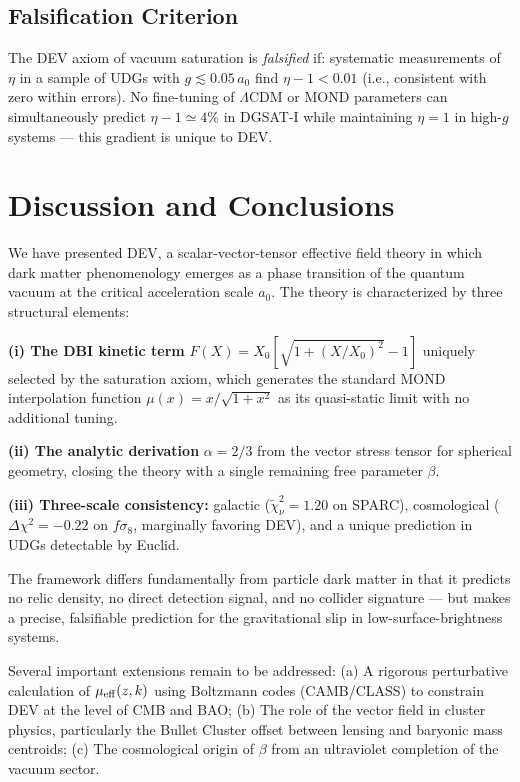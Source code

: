 \documentclass[aps,prd,twocolumn,showpacs,superscriptaddress]{revtex4-2}
\newcommand{\aO}{a_0}
\newcommand{\Xzero}{X_0}
\newcommand{\mueff}{\mu_{\rm eff}}
\newcommand{\LCDM}{$\Lambda$CDM}
\begin{document}
\subsection{Falsification Criterion}

The DEV axiom of vacuum saturation is \emph{falsified} if:
systematic measurements of $\eta$ in a sample of UDGs with
$g \lesssim 0.05\,\aO$ find $\eta - 1 < 0.01$ (i.e., consistent
with zero within errors).
No fine-tuning of \LCDM{} or MOND parameters can simultaneously
predict $\eta - 1 \simeq 4\%$ in DGSAT-I while maintaining
$\eta = 1$ in high-$g$ systems — this gradient is unique to DEV.

\section{Discussion and Conclusions}
\label{sec:conclusion}

We have presented DEV, a scalar-vector-tensor effective field theory
in which dark matter phenomenology emerges as a phase transition of
the quantum vacuum at the critical acceleration scale $\aO$.
The theory is characterized by three structural elements:

\textbf{(i) The DBI kinetic term} $F(X) = \Xzero[\sqrt{1+(X/\Xzero)^2}-1]$
uniquely selected by the saturation axiom, which generates the
standard MOND interpolation function $\mu(x) = x/\sqrt{1+x^2}$
as its quasi-static limit with no additional tuning.

\textbf{(ii) The analytic derivation} $\alpha = 2/3$ from the vector
stress tensor for spherical geometry, closing the theory with a
single remaining free parameter $\beta$.

\textbf{(iii) Three-scale consistency:}
galactic ($\widetilde\chi^2_\nu = 1.20$ on SPARC),
cosmological ($\Delta\chi^2 = -0.22$ on $f\sigma_8$,
marginally favoring DEV),
and a unique prediction in UDGs detectable by Euclid.

The framework differs fundamentally from particle dark matter
in that it predicts no relic density, no direct detection signal,
and no collider signature — but makes a precise, falsifiable
prediction for the gravitational slip in low-surface-brightness systems.

Several important extensions remain to be addressed:
(a) A rigorous perturbative calculation of $\mueff(z,k)$
    using Boltzmann codes (CAMB/CLASS) to constrain DEV at the
    level of CMB and BAO;
(b) The role of the vector field in cluster physics,
    particularly the Bullet Cluster offset between lensing
    and baryonic mass centroids;
(c) The cosmological origin of $\beta$ from an ultraviolet
    completion of the vacuum sector.
\end{document}
